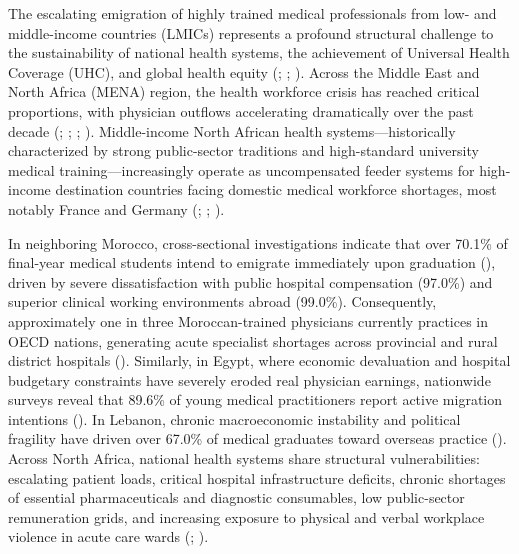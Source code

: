 \documentclass[
  11pt,
  a4paper]{article}
\begin{document}
The escalating emigration of highly trained medical professionals from
low- and middle-income countries (LMICs) represents a profound
structural challenge to the sustainability of national health systems,
the achievement of Universal Health Coverage (UHC), and global health
equity (;
;
). Across the Middle East and North
Africa (MENA) region, the health workforce crisis has reached critical
proportions, with physician outflows accelerating dramatically over the
past decade (; ;
; ). Middle-income North African health systems---historically
characterized by strong public-sector traditions and high-standard
university medical training---increasingly operate as uncompensated
feeder systems for high-income destination countries facing domestic
medical workforce shortages, most notably France and Germany
(;
;
).

In neighboring Morocco, cross-sectional investigations indicate that
over 70.1\% of final-year medical students intend to emigrate
immediately upon graduation (), driven by severe dissatisfaction with public hospital
compensation (97.0\%) and superior clinical working environments abroad
(99.0\%). Consequently, approximately one in three Moroccan-trained
physicians currently practices in OECD nations, generating acute
specialist shortages across provincial and rural district hospitals
().
Similarly, in Egypt, where economic devaluation and hospital budgetary
constraints have severely eroded real physician earnings, nationwide
surveys reveal that 89.6\% of young medical practitioners report active
migration intentions (). In
Lebanon, chronic macroeconomic instability and political fragility have
driven over 67.0\% of medical graduates toward overseas practice
(). Across North Africa, national
health systems share structural vulnerabilities: escalating patient
loads, critical hospital infrastructure deficits, chronic shortages of
essential pharmaceuticals and diagnostic consumables, low public-sector
remuneration grids, and increasing exposure to physical and verbal
workplace violence in acute care wards (; ).
\end{document}
